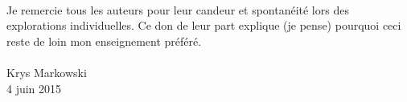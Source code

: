 \documentclass[12pt,twoside]{book}
\begin{document}
\paragraph{} Je remercie tous les auteurs pour leur candeur et spontanéité lors
des explorations individuelles. Ce don de leur part explique (je pense)
pourquoi ceci reste de loin mon enseignement préféré.

\paragraph{} Krys Markowski\\4 juin 2015

\thispagestyle{plain}



\thispagestyle{plain}

\tableofcontents

\mainmatter





\appendix


\end{document}
